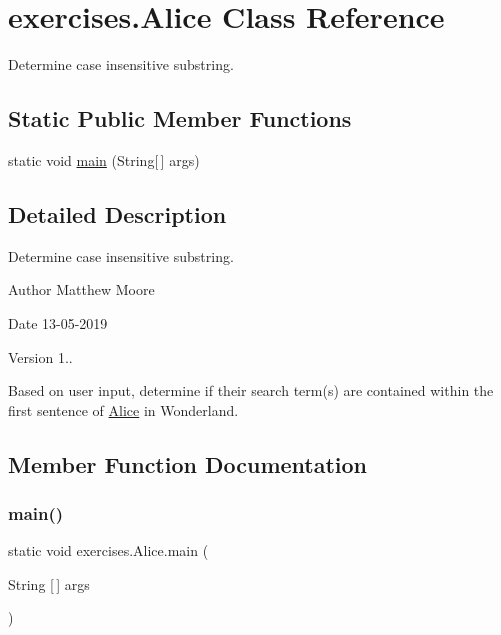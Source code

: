 \hypertarget{classexercises_1_1_alice}{}\section{exercises.\+Alice Class Reference}
\label{classexercises_1_1_alice}


Determine case insensitive substring.  


\subsection*{Static Public Member Functions}
\begin{DoxyCompactItemize}
\item 
static void \mbox{\hyperlink{classexercises_1_1_alice_a0cdf0c4ac9411444ac72542efb4f79ba}{main}} (String\mbox{[}$\,$\mbox{]} args)
\end{DoxyCompactItemize}


\subsection{Detailed Description}
Determine case insensitive substring. 

\begin{DoxyAuthor}{Author}
Matthew Moore 
\end{DoxyAuthor}
\begin{DoxyDate}{Date}
13-\/05-\/2019 
\end{DoxyDate}
\begin{DoxyVersion}{Version}
1..
\end{DoxyVersion}
Based on user input, determine if their search term(s) are contained within the first sentence of \mbox{\hyperlink{classexercises_1_1_alice}{Alice}} in Wonderland. 

\subsection{Member Function Documentation}
\mbox{\label{classexercises_1_1_alice_a0cdf0c4ac9411444ac72542efb4f79ba}} 
\subsubsection{\texorpdfstring{main()}{main()}}
{\footnotesize\ttfamily static void exercises.\+Alice.\+main (\begin{DoxyParamCaption}\item[{String \mbox{[}$\,$\mbox{]}}]{args }\end{DoxyParamCaption})\hspace{0.3cm}{\ttfamily [static]}}

